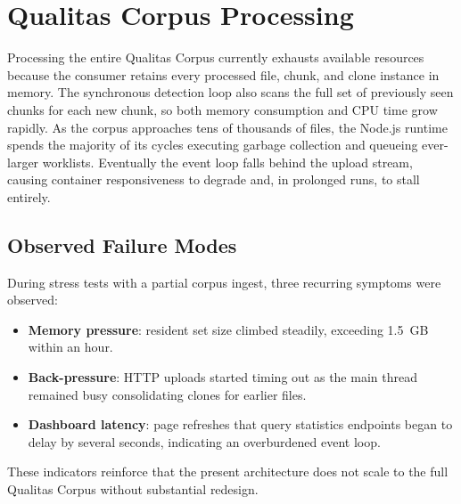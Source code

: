 \documentclass[11pt]{article}
\begin{document}
\section*{Qualitas Corpus Processing}
Processing the entire Qualitas Corpus currently exhausts available resources because the consumer retains every processed file, chunk, and clone instance in memory.
The synchronous detection loop also scans the full set of previously seen chunks for each new chunk, so both memory consumption and CPU time grow rapidly.
As the corpus approaches tens of thousands of files, the Node.js runtime spends the majority of its cycles executing garbage collection and queueing ever-larger worklists.
Eventually the event loop falls behind the upload stream, causing container responsiveness to degrade and, in prolonged runs, to stall entirely.

\subsection*{Observed Failure Modes}
During stress tests with a partial corpus ingest, three recurring symptoms were observed:
\begin{itemize}
  \item \textbf{Memory pressure}: resident set size climbed steadily, exceeding 1.5~GB within an hour.
  \item \textbf{Back-pressure}: HTTP uploads started timing out as the main thread remained busy consolidating clones for earlier files.
  \item \textbf{Dashboard latency}: page refreshes that query statistics endpoints began to delay by several seconds, indicating an overburdened event loop.
\end{itemize}
These indicators reinforce that the present architecture does not scale to the full Qualitas Corpus without substantial redesign.
\end{document}
